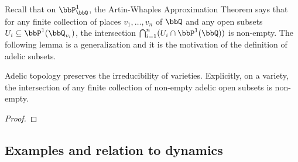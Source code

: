     Recall that on \(\bbP^1_\bbQ\), the Artin-Whaples Approximation Theorem says that for any finite collection of places \(v_1,\ldots,v_n\) of \(\bbQ\) and any open subsets \(U_i \subseteq \bbP^1(\bbQ_{v_i})\), 
    the intersection \(\bigcap_{i=1}^n (U_i\cap \bbP^1(\bbQ))\) is non-empty.
    The following lemma is a generalization and it is the motivation of the definition of adelic subsets.

    \begin{theorem}\label{thm:intersection_of_adelic_open_subset}
        Adelic topology preserves the irreducibility of varieties.
        Explicitly, on a variety, the intersection of any finite collection of non-empty adelic open subsets is non-empty.
    \end{theorem}
    \begin{proof}
    \end{proof}




\subsection{Examples and relation to dynamics}





